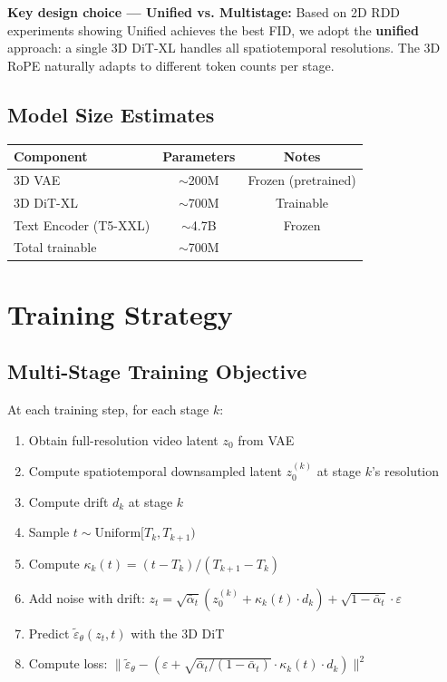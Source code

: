 \documentclass[11pt,a4paper]{article}
\begin{document}
\textbf{Key design choice --- Unified vs. Multistage:}
Based on 2D RDD experiments showing Unified achieves the best FID, we adopt the \textbf{unified} approach: a single 3D DiT-XL handles all spatiotemporal resolutions. The 3D RoPE naturally adapts to different token counts per stage.

\subsection{Model Size Estimates}

\begin{table}[h]
\centering
\begin{tabular}{lcc}
\toprule
Component & Parameters & Notes \\
\midrule
3D VAE & $\sim$200M & Frozen (pretrained) \\
3D DiT-XL & $\sim$700M & Trainable \\
Text Encoder (T5-XXL) & $\sim$4.7B & Frozen \\
\midrule
Total trainable & $\sim$700M & \\
\bottomrule
\end{tabular}
\end{table}

\section{Training Strategy}

\subsection{Multi-Stage Training Objective}

At each training step, for each stage $k$:
\begin{enumerate}[nosep]
\item Obtain full-resolution video latent $z_0$ from VAE
\item Compute spatiotemporal downsampled latent $z_0^{(k)}$ at stage $k$'s resolution
\item Compute drift $d_k$ at stage $k$
\item Sample $t \sim \text{Uniform}[T_k, T_{k+1})$
\item Compute $\kappa_k(t) = (t - T_k)/(T_{k+1} - T_k)$
\item Add noise with drift: $z_t = \sqrt{\bar\alpha_t} (z_0^{(k)} + \kappa_k(t) \cdot d_k) + \sqrt{1-\bar\alpha_t} \cdot \varepsilon$
\item Predict $\tilde\varepsilon_\theta(z_t, t)$ with the 3D DiT
\item Compute loss: $\|\tilde\varepsilon_\theta - (\varepsilon + \sqrt{\bar\alpha_t/(1-\bar\alpha_t)} \cdot \kappa_k(t) \cdot d_k)\|^2$
\end{enumerate}
\end{document}
